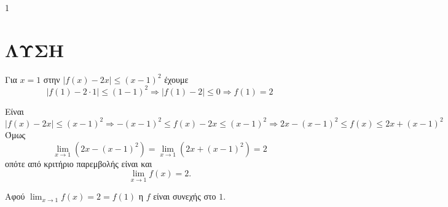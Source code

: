 \begin{ylh}{1}
    \item [Ύλη από εικόνα]
\end{ylh}
\section*{\centering ΛΥΣΗ}

\begin{alist}
    \item Για $x=1$ στην $|f(x)-2x| \le (x-1)^2$ έχουμε
    \[
        |f(1)-2\cdot 1| \le (1-1)^2 \Rightarrow |f(1)-2| \le 0 \Rightarrow f(1)=2
    \]

    \item Είναι
    \[
        |f(x)-2x| \le (x-1)^2 \Rightarrow -(x-1)^2 \le f(x)-2x \le (x-1)^2 \Rightarrow 2x-(x-1)^2 \le f(x) \le 2x+(x-1)^2
    \]
    Όμως
    \[
        \lim_{x\to 1} (2x-(x-1)^2) = \lim_{x\to 1} (2x+(x-1)^2) = 2
    \]
    οπότε από κριτήριο παρεμβολής είναι και
    \[
        \lim_{x\to 1} f(x) = 2.
    \]

    \item Αφού $\lim_{x\to 1} f(x) = 2 = f(1)$ η $f$ είναι συνεχής στο $1$.
\end{alist}